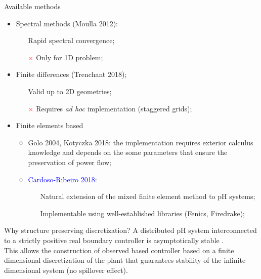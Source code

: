 \documentclass[aspectratio=169]{ISAE-Beamer}
\begin{document}
\begin{frame}{}
\begin{exampleblock}{Available methods}
	\begin{itemize}
		\item Spectral methods (Moulla 2012):
		\begin{itemize}
			\item[\textcolor{green}{\checkmark}] Rapid spectral convergence;
			\item[\textcolor{red}{$\times$}] Only for 1D problem;
		\end{itemize}
		\item Finite differences (Trenchant 2018);
		\begin{itemize}
			\item[\textcolor{green}{\checkmark}] Valid up to 2D geometries;
			\item[\textcolor{red}{$\times$}] Requires \textit{ad hoc} implementation (staggered grids);
		\end{itemize}
		\item Finite elements based
		\begin{itemize}
			\item Golo 2004, Kotyczka 2018: the implementation requires exterior calculus knowledge and depends on the some parameters that ensure the preservation of power flow;		
			\item \textcolor{blue}{Cardoso-Ribeiro 2018}:
			\begin{itemize}
				\item[\textcolor{green}{\checkmark}] Natural extension of the mixed finite element method to pH systems;
				\item[\textcolor{green}{\checkmark}] Implementable using well-established libraries (Fenics, Firedrake);
			\end{itemize}
		\end{itemize}
	\end{itemize}
\end{exampleblock}
\end{frame}

\begin{frame}{Why structure preserving discretization?}
A distributed pH system interconnected to a strictly positive real boundary controller  is asymptotically stable . \\
\vspace{1cm}
This allows the construction of observed based controller based on a finite dimensional discretization of the plant  that guarantees stability of the infinite dimensional system (no spillover effect).

\end{frame}
\end{document}
